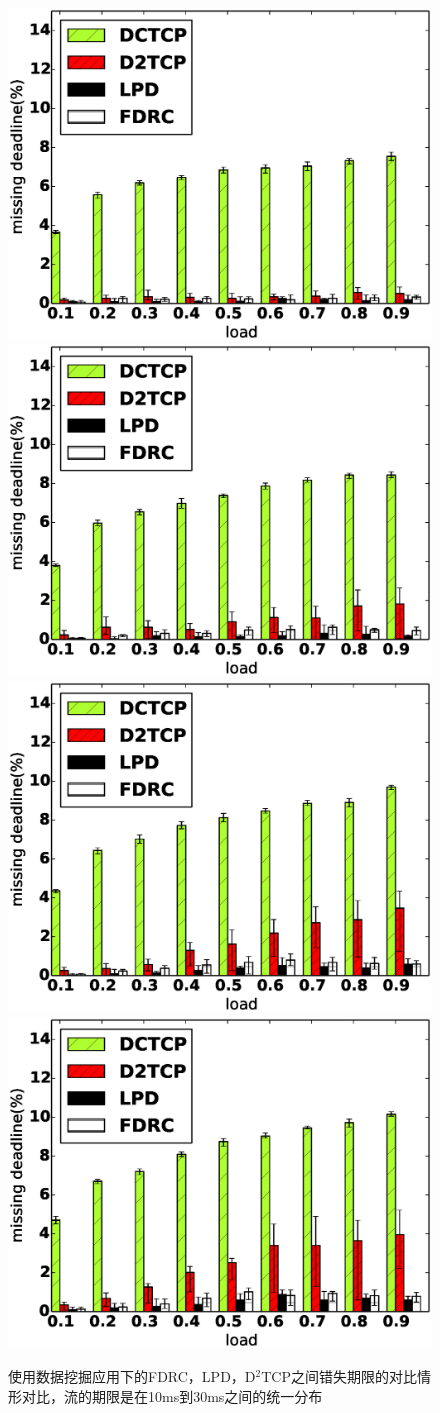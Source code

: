 \begin{figure}[h]
  \centering%
    {\includegraphics[width=0.5\columnwidth]{figures/FDRC/evaluation/spineleaf/miss_deadline_4.eps}}%
      {\includegraphics[width=0.5\columnwidth]{figures/FDRC/evaluation/spineleaf/miss_deadline_6.eps}}
    {\includegraphics[width=0.5\columnwidth]{figures/FDRC/evaluation/spineleaf/miss_deadline_8.eps}}%
      {\includegraphics[width=0.5\columnwidth]{figures/FDRC/evaluation/spineleaf/miss_deadline_9.eps}}
  \caption{使用数据挖掘应用下的FDRC，LPD，D$^2$TCP之间错失期限的对比情形对比，流的期限是在10ms到30ms之间的统一分布}
  \label{fdrc-miss-spine-data-fig}
\end{figure}


